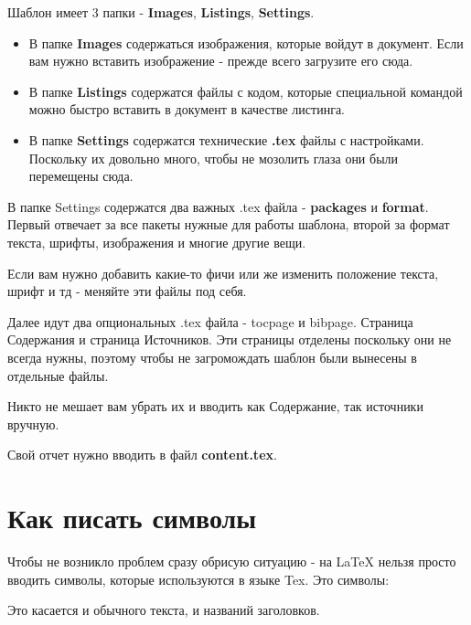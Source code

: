 Шаблон имеет 3 папки - \textbf{Images}, \textbf{Listings}, \textbf{Settings}. 
\begin{itemize}
\item В папке \textbf{Images} содержаться изображения, которые войдут в документ. Если вам нужно вставить изображение - прежде всего загрузите его сюда.
\item В папке \textbf{Listings} содержатся файлы с кодом, которые специальной командой можно быстро вставить в документ в качестве листинга.
\item В папке \textbf{Settings} содержатся технические \textbf{.tex} файлы с настройками. Поскольку их довольно много, чтобы не мозолить глаза они были перемещены сюда.
\end{itemize}
В папке Settings содержатся два важных .tex файла - \textbf{packages }и \textbf{format}. Первый отвечает за все пакеты нужные для работы шаблона, второй за формат текста, шрифты, изображения и многие другие вещи.

Если вам нужно добавить какие-то фичи или же изменить положение текста, шрифт и тд - меняйте эти файлы под себя.

Далее идут два опциональных .tex файла - tocpage и bibpage. Страница Содержания и страница Источников. Эти страницы отделены поскольку они не всегда нужны, поэтому чтобы не загромождать шаблон были вынесены в отдельные файлы.

Никто не мешает вам убрать их и вводить как Содержание, так источники вручную.

Свой отчет нужно вводить в файл \textbf{content.tex}.


\section{Как писать символы}
Чтобы не возникло проблем сразу обрисую ситуацию - на LaTeX нельзя просто вводить символы, которые используются в языке Tex. Это символы:

Это касается и обычного текста, и названий заголовков.








